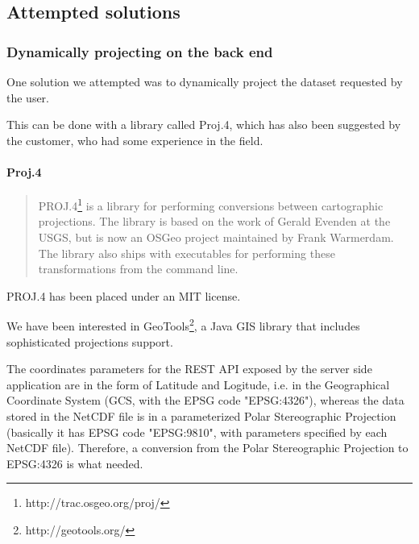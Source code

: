 \documentclass[11pt,a4paper,titlepage,oneside]{report}
\begin{document}
\subsection{Attempted solutions}
\subsubsection{Dynamically projecting on the back end}
One solution we attempted was to dynamically project the dataset requested by the user. 

This can be done with a library called Proj.4, which has also been suggested by the customer, who had some experience in the field.

\paragraph{Proj.4}
\begin{quote}
PROJ.4\footnote{http://trac.osgeo.org/proj/} is a library for performing conversions between cartographic projections. The library is based on the work of Gerald Evenden at the USGS, but is now an OSGeo project maintained by Frank Warmerdam. The library also ships with executables for performing these transformations from the command line.
\end{quote}
PROJ.4 has been placed under an MIT license. 

We have been interested in GeoTools\footnote{http://geotools.org/}, a Java \gls{GIS} library that includes sophisticated projections support.

The coordinates parameters for the REST \gls{API} exposed by the server side application are in the form of Latitude and Logitude, i.e. in the Geographical Coordinate System (\gls{GCS}, with the EPSG code "EPSG:4326"), whereas the data stored in the NetCDF file is in a parameterized Polar Stereographic Projection (basically it has EPSG code "EPSG:9810", with parameters specified by each NetCDF file).
Therefore, a conversion from the Polar Stereographic Projection to EPSG:4326 is what needed.
\end{document}
